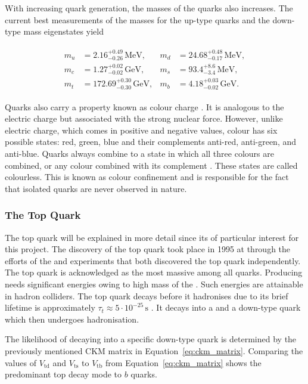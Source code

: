 \documentclass[bachelor,ngerman,english]{GAUBM}
\begin{document}
With increasing quark generation, the masses of the quarks also increases. The current best measurements of the masses for the up-type quarks and the down-type mass eigenstates \cite{pdg} yield 

\begin{gather}
    \begin{aligned}
        m_u &= 2.16^{+0.49}_{-0.26}\,\text{MeV},    & m_d &= 24.68^{+0.48}_{-0.17}\,\text{MeV},\\
        m_c &= 1.27^{+0.02}_{-0.02}\,\text{GeV},    & m_s &= 93.4^{+8.6}_{-3.4}\,\text{MeV},\\
        m_t &= 172.69^{+0.30}_{-0.30}\,\text{GeV},  & m_b &= 4.18^{+0.03}_{-0.02}\,\text{GeV}.
        \label{eq:mass_quarks}
    \end{aligned}
\end{gather}

Quarks also carry a property known as colour charge \cite{theory:qcd_01,theory:qcd_02}. It is analogous to the electric charge but associated with the strong nuclear force. However, unlike electric charge, which comes in positive and negative values, colour has six possible states: red, green, blue and their complements anti-red, anti-green, and anti-blue. Quarks always combine to a state in which all three colours are combined, or any colour combined with its complement \cite{theory:qcd_02}. These states are called colourless. This is known as colour confinement and is responsible for the fact that isolated quarks are never observed in nature.

\subsubsection*{The Top Quark}
The top quark will be explained in more detail since its of particular interest for this project. The discovery of the top quark took place in 1995 at \fermilab through the efforts of the \dzero \cite{theory:top_discovery_01} and \cdf \cite{theory:top_discovery_02} experiments that both discovered the top quark independently. The top quark is acknowledged as the most massive among all quarks. Producing \tquarks needs significant energies owing to high mass of the \tquark. Such energies are attainable in hadron colliders. The top quark decays before it hadronises due to its brief lifetime is approximately $\tau_t\approx5\cdot10^{-25}\,\text{s}$ \cite{pdg}. It decays into a \wboson and a down-type quark which then undergoes hadronisation. 

The likelihood of decaying into a specific down-type quark is determined by the previously mentioned CKM matrix in Equation~\ref{eq:ckm_matrix}. Comparing the values of $V_\text{td}$ and $V_\text{ts}$ to $V_\text{tb}$ from Equation~\ref{eq:ckm_matrix} shows the predominant top decay mode to $b$ quarks.
 
\end{document}
